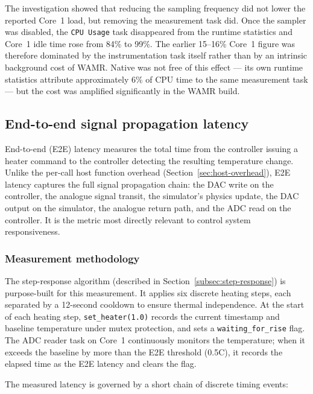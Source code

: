 \documentclass[12pt, a4paper]{report}
\begin{document}
The investigation showed that reducing the sampling frequency did not lower
the reported Core~1 load, but removing the measurement task did. Once the sampler was disabled,
the \texttt{CPU Usage} task disappeared from the runtime statistics and Core~1 idle time rose from
84\% to 99\%. The earlier 15--16\% Core~1 figure was therefore dominated by the instrumentation
task itself rather than by an intrinsic background cost of WAMR. Native was not free of this
effect --- its own runtime statistics attribute approximately 6\% of CPU time to the same
measurement task --- but the cost was amplified significantly in the WAMR build.


\subsection{End-to-end signal propagation latency}
\label{sec:e2e-latency}

End-to-end (E2E) latency measures the total time from the controller issuing a heater command to the controller detecting the resulting temperature change. Unlike the per-call host function overhead (Section~\ref{sec:host-overhead}), E2E latency captures the full signal propagation chain: the DAC write on the controller, the analogue signal transit, the simulator's physics update, the DAC output on the simulator, the analogue return path, and the ADC read on the controller. It is the metric most directly relevant to control system responsiveness.

\subsubsection{Measurement methodology}
\label{subsec:e2e-method}

The step-response algorithm (described in Section~\ref{subsec:step-response}) is purpose-built for this measurement. It applies six discrete heating steps, each separated by a 12-second cooldown to ensure thermal independence. At the start of each heating step, \texttt{set\_heater(1.0)} records the current timestamp and baseline temperature under mutex protection, and sets a \texttt{waiting\_for\_rise} flag. The ADC reader task on Core~1 continuously monitors the temperature; when it exceeds the baseline by more than the E2E threshold (0.5\textdegree C), it records the elapsed time as the E2E latency and clears the flag.

The measured latency is governed by a short chain of discrete timing events:
\end{document}
